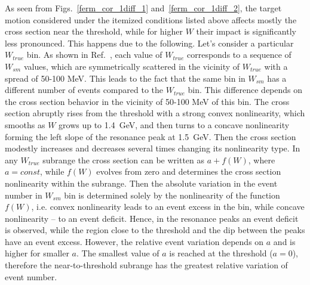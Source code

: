 As seen from Figs.~\ref{ferm_cor_1diff_1} and~\ref{ferm_cor_1diff_2}, the target motion considered under the itemized conditions listed above affects mostly the cross section near the threshold, while for higher $W$ their impact is significantly less pronounced. This happens due to the following. Let's consider a particular $W_{true}$ bin. As shown in Ref.~\cite{twopeg-d}, each value of $W_{true}$ corresponds to a sequence of $W_{sm}$ values, which are symmetrically scattered in the vicinity of $W_{true}$ with a spread of 50-100 MeV. This leads to the fact that the same bin in $W_{sm}$ has a different number of events compared to the $W_{true}$ bin. This difference depends on the cross section behavior in the vicinity of 50-100 MeV of this bin. The cross section abruptly rises from the threshold with a strong convex nonlinearity, which smooths as $W$ grows up to 1.4~GeV, and then turns to a concave nonlinearity forming the left slope of the resonance peak at 1.5~GeV. Then the cross section modestly increases and decreases several times changing its nonlinearity type. In any $W_{true}$ subrange the cross section can be written as $a + f(W)$, where $a=const$, while $f(W)$ evolves from zero and determines the cross section nonlinearity within the subrange.  Then the absolute variation in the event number in $W_{sm}$ bin is determined solely by the nonlinearity of the function $f(W)$, i.e. convex nonlinearity leads to an event excess in the bin, while concave nonlinearity -- to an event deficit. Hence, in the resonance peaks an event deficit is observed, while the region close to the threshold and the dip between the peaks have an event excess. However, the relative event variation depends on $a$ and is higher for smaller $a$. The smallest value of $a$ is reached at the threshold ($a = 0$), therefore the near-to-threshold subrange has the greatest relative variation of event number.




